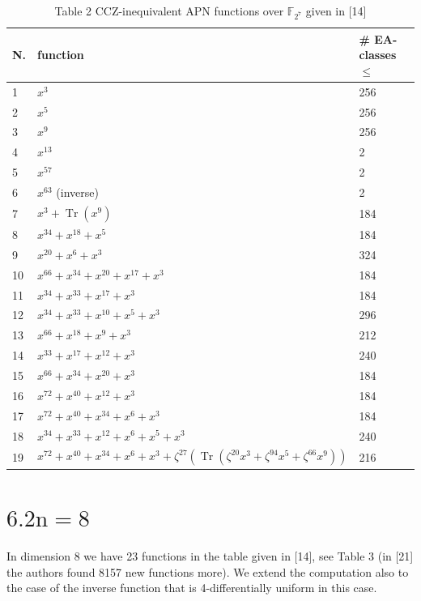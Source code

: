 \documentclass[10pt]{article}
\begin{document}
\begin{table}[h]
\begin{center}
\captionsetup{labelformat=empty}
\caption{Table 2 CCZ-inequivalent APN functions over $\mathbb{F}_{2^{7}}$ given in [14]}
\begin{tabular}{|l|l|l|}
\hline
N. & function & \# EA-classes $\leq$ \\
\hline
1 & $x^{3}$ & 256 \\
\hline
2 & $x^{5}$ & 256 \\
\hline
3 & $x^{9}$ & 256 \\
\hline
4 & $x^{13}$ & 2 \\
\hline
5 & $x^{57}$ & 2 \\
\hline
6 & $x^{63}$ (inverse) & 2 \\
\hline
7 & $x^{3}+\operatorname{Tr}\left(x^{9}\right)$ & 184 \\
\hline
8 & $x^{34}+x^{18}+x^{5}$ & 184 \\
\hline
9 & $x^{20}+x^{6}+x^{3}$ & 324 \\
\hline
10 & $x^{66}+x^{34}+x^{20}+x^{17}+x^{3}$ & 184 \\
\hline
11 & $x^{34}+x^{33}+x^{17}+x^{3}$ & 184 \\
\hline
12 & $x^{34}+x^{33}+x^{10}+x^{5}+x^{3}$ & 296 \\
\hline
13 & $x^{66}+x^{18}+x^{9}+x^{3}$ & 212 \\
\hline
14 & $x^{33}+x^{17}+x^{12}+x^{3}$ & 240 \\
\hline
15 & $x^{66}+x^{34}+x^{20}+x^{3}$ & 184 \\
\hline
16 & $x^{72}+x^{40}+x^{12}+x^{3}$ & 184 \\
\hline
17 & $x^{72}+x^{40}+x^{34}+x^{6}+x^{3}$ & 184 \\
\hline
18 & $x^{34}+x^{33}+x^{12}+x^{6}+x^{5}+x^{3}$ & 240 \\
\hline
19 & $x^{72}+x^{40}+x^{34}+x^{6}+x^{3}+\zeta^{27}\left(\operatorname{Tr}\left(\zeta^{20} x^{3}+\zeta^{94} x^{5}+\zeta^{66} x^{9}\right)\right)$ & 216 \\
\hline
\end{tabular}
\end{center}
\end{table}

\section*{$6.2 \mathrm{n}=8$}
In dimension 8 we have 23 functions in the table given in [14], see Table 3 (in [21] the authors found 8157 new functions more). We extend the computation also to the case of the inverse function that is 4-differentially uniform in this case.
\end{document}
